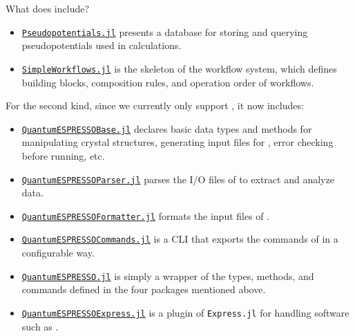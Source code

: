 \begin{frame}[allowframebreaks]{What does \express{} include?}
{\begin{itemize}
                        \item \href{https://github.com/MineralsCloud/Pseudopotentials.jl}{\texttt{Pseudopotentials.jl}} presents
                              a database for storing and querying pseudopotentials used in \ab{} calculations.
                        \item \href{https://github.com/MineralsCloud/SimpleWorkflows.jl}{\texttt{SimpleWorkflows.jl}}
                              is the skeleton of the workflow system, which
                              defines building blocks, composition rules, and operation order of workflows.
                  \end{itemize}
            }

      For the second kind, since we currently only support \qe{}, it now includes:
      {\footnotesize
      \begin{itemize}
            \item \href{https://github.com/MineralsCloud/QuantumESPRESSOBase.jl}{\texttt{QuantumESPRESSOBase.jl}}
                  declares basic data types and methods
                  for manipulating crystal structures, generating input files for \qe{},
                  error checking before running, etc.
            \item \href{https://github.com/MineralsCloud/QuantumESPRESSOParser.jl}{\texttt{QuantumESPRESSOParser.jl}}
                  parses the I/O files of \qe{} to extract and analyze data.
            \item \href{https://github.com/MineralsCloud/QuantumESPRESSOFormatter.jl}{\texttt{QuantumESPRESSOFormatter.jl}}
                  formats the input files of \qe{}.
            \item \href{https://github.com/MineralsCloud/QuantumESPRESSOCommands.jl}{\texttt{QuantumESPRESSOCommands.jl}}
                  is a CLI that exports the commands of \qe{} in a configurable way.
            \item \href{https://github.com/MineralsCloud/QuantumESPRESSO.jl}{\texttt{QuantumESPRESSO.jl}}
                  is simply a wrapper of the types, methods, and commands defined in
                  the four packages mentioned above.
            \item \href{https://github.com/MineralsCloud/QuantumESPRESSOExpress.jl}{\texttt{QuantumESPRESSOExpress.jl}}
                  is a plugin of \texttt{Express.jl} for handling \ab{} software such as \qe{}.
      \end{itemize}
      }
\end{frame}
